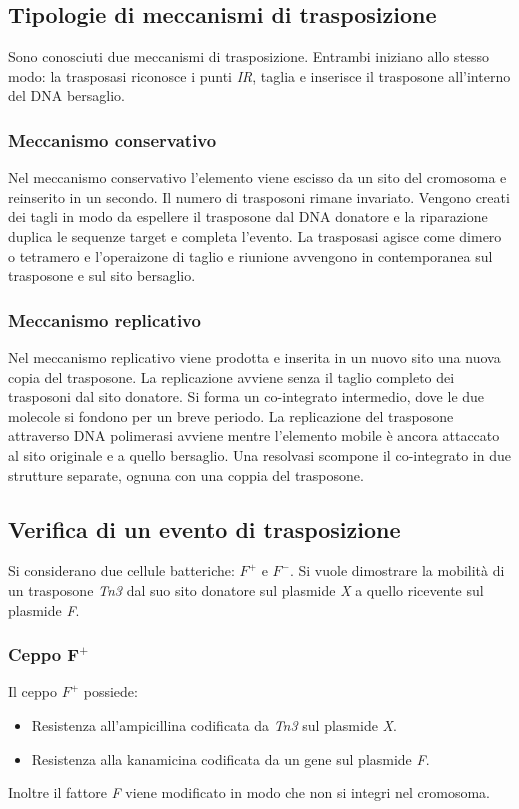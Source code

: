	\subsection{Tipologie di meccanismi di trasposizione}
	Sono conosciuti due meccanismi di trasposizione.
	Entrambi iniziano allo stesso modo: la trasposasi riconosce i punti \emph{IR}, taglia e inserisce il trasposone all'interno del DNA bersaglio.

		\subsubsection{Meccanismo conservativo}
		Nel meccanismo conservativo l'elemento viene escisso da un sito del cromosoma e reinserito in un secondo.
		Il numero di trasposoni rimane invariato.
		Vengono creati dei tagli in modo da espellere il trasposone dal DNA donatore e la riparazione duplica le sequenze target e completa l'evento.
		La trasposasi agisce come dimero o tetramero e l'operaizone di taglio e riunione avvengono in contemporanea sul trasposone e sul sito bersaglio.

		\subsubsection{Meccanismo replicativo}
		Nel meccanismo replicativo viene prodotta e inserita in un nuovo sito una nuova copia del trasposone.
		La replicazione avviene senza il taglio completo dei trasposoni dal sito donatore.
		Si forma un co-integrato intermedio, dove le due molecole si fondono per un breve periodo.
		La replicazione del trasposone attraverso DNA polimerasi avviene mentre l'elemento mobile \`e ancora attaccato al sito originale e a quello bersaglio.
		Una resolvasi scompone il co-integrato in due strutture separate, ognuna con una coppia del trasposone.

		
	\subsection{Verifica di un evento di trasposizione}
	Si considerano due cellule batteriche: \emph{$F^+$} e \emph{$F^-$}. 
	Si vuole dimostrare la mobilità di un trasposone \emph{Tn3} dal suo sito donatore sul plasmide \emph{X} a quello ricevente sul plasmide \emph{F}.

		\subsubsection{Ceppo \emph{$\mathbf{F^+}$}}
		Il ceppo \emph{$F^+$} possiede:
		\begin{multicols}{2}
			\begin{itemize}
				\item Resistenza all'ampicillina codificata da \emph{Tn3} sul plasmide \emph{X}.
				\item Resistenza alla kanamicina codificata da un gene sul plasmide \emph{F}.
			\end{itemize}
		\end{multicols}
		Inoltre il fattore \emph{F} viene modificato in modo che non si integri nel cromosoma.

